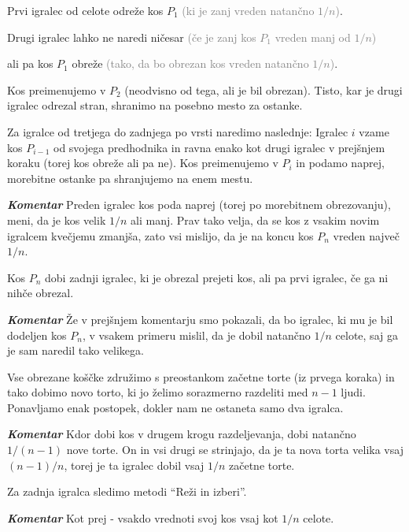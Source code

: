 \documentclass[a4paper,12pt]{article}
\begin{document}
\begin{protokol}

\item Prvi igralec od celote odreže kos $P_1$ \textcolor{gray}{(ki je zanj vreden natančno $1/n$)}.

\item Drugi igralec lahko ne naredi ničesar \textcolor{gray}{(če je zanj kos $P_1$ vreden manj od $1/n$)}

ali pa kos $P_1$ obreže \textcolor{gray}{(tako, da bo obrezan kos vreden natančno $1/n$)}.

Kos preimenujemo v $P_2$ (neodvisno od tega, ali je bil obrezan). Tisto, kar je drugi igralec odrezal stran, shranimo na posebno mesto za ostanke.

\item Za igralce od tretjega do zadnjega po vrsti naredimo naslednje: Igralec $i$ vzame kos $P_{i-1}$ od svojega predhodnika in ravna enako kot drugi igralec v prejšnjem koraku (torej kos obreže ali pa ne). Kos preimenujemo v $P_i$ in podamo naprej, morebitne ostanke pa shranjujemo na enem mestu.

\item [\textbf{\em Komentar}] Preden igralec kos poda naprej (torej po morebitnem obrezovanju), meni, da je kos velik $1/n$ ali manj. Prav tako velja, da se kos z vsakim novim igralcem kvečjemu zmanjša, zato vsi mislijo, da je na koncu kos $P_n$ vreden največ $1/n$.

\item Kos $P_n$ dobi zadnji igralec, ki je obrezal prejeti kos, ali pa prvi igralec, če ga ni nihče obrezal.

\item [\textbf{\em Komentar}] Že v prejšnjem komentarju smo pokazali, da bo igralec, ki mu je bil dodeljen kos $P_n$, v vsakem primeru mislil, da je dobil natančno $1/n$ celote, saj ga je sam naredil tako velikega.

\item Vse obrezane koščke združimo s preostankom začetne torte (iz prvega koraka) in tako dobimo novo torto, ki jo želimo sorazmerno razdeliti med $n - 1$ ljudi. Ponavljamo enak postopek, dokler nam ne ostaneta samo dva igralca.

\item [\textbf{\em Komentar}] Kdor dobi kos v drugem krogu razdeljevanja, dobi natančno $1/(n - 1)$ nove torte. On in vsi drugi se strinjajo, da je ta nova torta velika vsaj $(n - 1)/n$, torej je ta igralec dobil vsaj $1/n$ začetne torte.

\item Za zadnja igralca sledimo metodi ``Reži in izberi''.

\item [\textbf{\em Komentar}] Kot prej - vsakdo vrednoti svoj kos vsaj kot $1/n$ celote.

\end{protokol}
\end{document}
